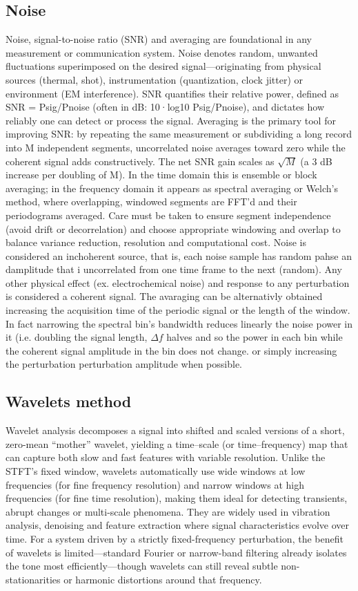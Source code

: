 \subsection{Noise}

Noise, signal-to-noise ratio (SNR) and averaging are foundational in any measurement or communication system. Noise denotes random, unwanted fluctuations superimposed on the desired signal—originating from physical sources (thermal, shot), instrumentation (quantization, clock jitter) or environment (EM interference). SNR quantifies their relative power, defined as SNR = Psig/Pnoise (often in dB: 10·log10 Psig/Pnoise), and dictates how reliably one can detect or process the signal. Averaging is the primary tool for improving SNR: by repeating the same measurement or subdividing a long record into M independent segments, uncorrelated noise averages toward zero while the coherent signal adds constructively. The net SNR gain scales as $\sqrt{M}$ (a 3 dB increase per doubling of M). In the time domain this is ensemble or block averaging; in the frequency domain it appears as spectral averaging or Welch’s method, where overlapping, windowed segments are FFT’d and their periodograms averaged. Care must be taken to ensure segment independence (avoid drift or decorrelation) and choose appropriate windowing and overlap to balance variance reduction, resolution and computational cost. 
Noise is considered an inchoherent source, that is, each noise sample has random pahse an damplitude that i uncorrelated from one time frame to the next (random). Any other physical effect (ex. electrochemical noise) and response to any perturbation is considered a coherent signal.
The avaraging can be alternativly obtained increasing the acquisition time of the periodic signal or the length of the window. In fact narrowing the spectral bin's bandwidth reduces linearly the noise power in it (i.e. doubling the signal length, $\Delta f$ halves and so the power in each bin while the coherent signal amplitude in the bin does not change.
or simply increasing the perturbation perturbation amplitude when possible.

\subsection{Wavelets method}

Wavelet analysis decomposes a signal into shifted and scaled versions of a short, zero-mean “mother” wavelet, yielding a time–scale (or time–frequency) map that can capture both slow and fast features with variable resolution. Unlike the STFT’s fixed window, wavelets automatically use wide windows at low frequencies (for fine frequency resolution) and narrow windows at high frequencies (for fine time resolution), making them ideal for detecting transients, abrupt changes or multi-scale phenomena. They are widely used in vibration analysis, denoising and feature extraction where signal characteristics evolve over time. For a system driven by a strictly fixed-frequency perturbation, the benefit of wavelets is limited—standard Fourier or narrow-band filtering already isolates the tone most efficiently—though wavelets can still reveal subtle non-stationarities or harmonic distortions around that frequency.

